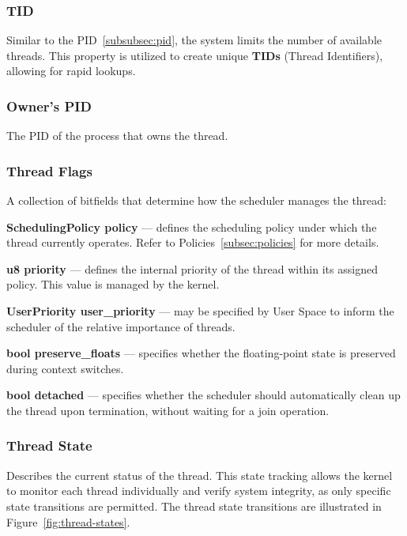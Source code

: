 \documentclass[a4paper,10pt,twoside]{report}
\theoremstyle{definition}
\begin{document}
\subsubsection{TID}

Similar to the PID~\ref{subsubsec:pid}, the system limits the number of available threads. This property is utilized to create unique \textbf{TIDs} (Thread Identifiers), allowing for rapid lookups.

\subsubsection{Owner's PID}

The PID of the process that owns the thread.

\subsubsection{Thread Flags}

A collection of bitfields that determine how the scheduler manages the thread:

\textbf{SchedulingPolicy policy} --- defines the scheduling policy under which the thread currently operates. Refer to Policies~\ref{subsec:policies} for more details.

\textbf{u8 priority} --- defines the internal priority of the thread within its assigned policy. This value is managed by the kernel.

\textbf{UserPriority user\_priority} --- may be specified by User Space to inform the scheduler of the relative importance of threads.

\textbf{bool preserve\_floats} --- specifies whether the floating-point state is preserved during context switches.

\textbf{bool detached} --- specifies whether the scheduler should automatically clean up the thread upon termination, without waiting for a join operation.

\subsubsection{Thread State}

Describes the current status of the thread. This state tracking allows the kernel to monitor each thread individually and verify system integrity, as only specific state transitions are permitted. The thread state transitions are illustrated in Figure~\ref{fig:thread-states}.

\end{document}

